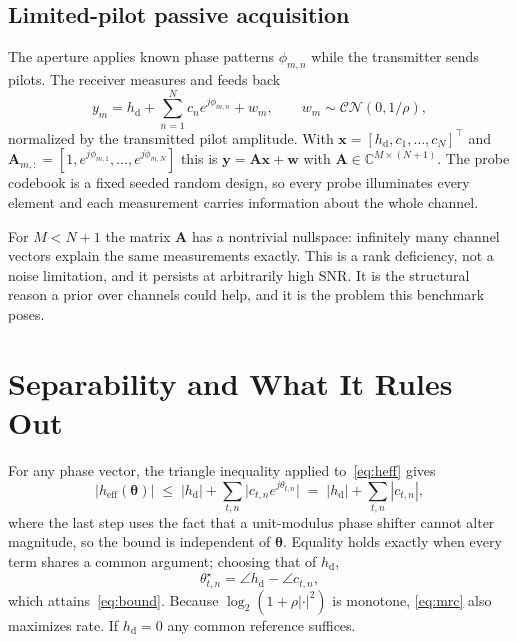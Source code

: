 \documentclass[journal]{IEEEtran}
\begin{document}
\subsection{Limited-pilot passive acquisition}
\label{sec:obs}
The aperture applies known phase patterns $\phi_{m,n}$ while the transmitter sends pilots. The receiver measures and feeds back
\begin{equation}
y_m = h_{\mathrm{d}} + \sum_{n=1}^{N} c_n e^{j\phi_{m,n}} + w_m,
\qquad w_m\sim\mathcal{CN}(0,1/\rho),
\label{eq:pilot}
\end{equation}
normalized by the transmitted pilot amplitude. With $\bm{x}=[h_{\mathrm{d}},c_1,\dots,c_N]^{\!\top}$ and $\bm{A}_{m,:}=[1,e^{j\phi_{m,1}},\dots,e^{j\phi_{m,N}}]$ this is $\bm{y}=\bm{A}\bm{x}+\bm{w}$ with $\bm{A}\in\mathbb{C}^{M\times(N+1)}$. The probe codebook is a fixed seeded random design, so every probe illuminates every element and each measurement carries information about the whole channel.

For $M<N+1$ the matrix $\bm{A}$ has a nontrivial nullspace: infinitely many channel vectors explain the same measurements exactly. This is a rank deficiency, not a noise limitation, and it persists at arbitrarily high SNR. It is the structural reason a prior over channels could help, and it is the problem this benchmark poses.

\section{Separability and What It Rules Out}
\label{sec:sep}

For any phase vector, the triangle inequality applied to~\eqref{eq:heff} gives
\begin{equation}
\bigl|h_{\mathrm{eff}}(\bm{\theta})\bigr| \;\le\; |h_{\mathrm{d}}| + \sum_{t,n}\bigl|c_{t,n}e^{j\theta_{t,n}}\bigr| \;=\; |h_{\mathrm{d}}| + \sum_{t,n}|c_{t,n}|,
\label{eq:bound}
\end{equation}
where the last step uses the fact that a unit-modulus phase shifter cannot alter magnitude, so the bound is independent of $\bm{\theta}$. Equality holds exactly when every term shares a common argument; choosing that of $h_{\mathrm{d}}$,
\begin{equation}
\theta^{\star}_{t,n} = \angle h_{\mathrm{d}} - \angle c_{t,n},
\label{eq:mrc}
\end{equation}
which attains~\eqref{eq:bound}. Because $\log_2(1+\rho|\cdot|^2)$ is monotone, \eqref{eq:mrc} also maximizes rate. If $h_{\mathrm{d}}=0$ any common reference suffices.
\end{document}
